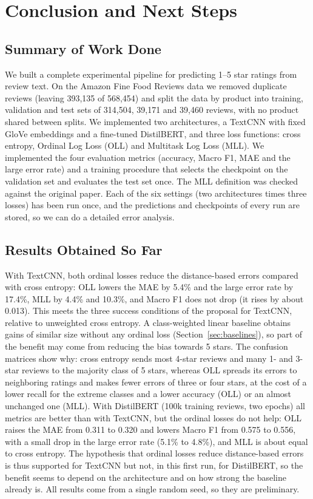 \section{Conclusion and Next Steps}
\label{sec:conclusion}

\subsection{Summary of Work Done}
We built a complete experimental pipeline for predicting 1--5 star ratings from review text. On the Amazon Fine Food Reviews data we removed duplicate reviews (leaving 393{,}135 of 568{,}454) and split the data by product into training, validation and test sets of 314{,}504, 39{,}171 and 39{,}460 reviews, with no product shared between splits. We implemented two architectures, a TextCNN with fixed GloVe embeddings and a fine-tuned DistilBERT, and three loss functions: cross entropy, Ordinal Log Loss (OLL) and Multitask Log Loss (MLL). We implemented the four evaluation metrics (accuracy, Macro F1, MAE and the large error rate) and a training procedure that selects the checkpoint on the validation set and evaluates the test set once. The MLL definition was checked against the original paper. Each of the six settings (two architectures times three losses) has been run once, and the predictions and checkpoints of every run are stored, so we can do a detailed error analysis.

\subsection{Results Obtained So Far}
With TextCNN, both ordinal losses reduce the distance-based errors compared with cross entropy: OLL lowers the MAE by 5.4\% and the large error rate by 17.4\%, MLL by 4.4\% and 10.3\%, and Macro F1 does not drop (it rises by about 0.013). This meets the three success conditions of the proposal for TextCNN, relative to unweighted cross entropy. A class-weighted linear baseline obtains gains of similar size without any ordinal loss (Section~\ref{sec:baselines}), so part of the benefit may come from reducing the bias towards 5 stars. The confusion matrices show why: cross entropy sends most 4-star reviews and many 1- and 3-star reviews to the majority class of 5 stars, whereas OLL spreads its errors to neighboring ratings and makes fewer errors of three or four stars, at the cost of a lower recall for the extreme classes and a lower accuracy (OLL) or an almost unchanged one (MLL).
With DistilBERT (100k training reviews, two epochs) all metrics are better than with TextCNN, but the ordinal losses do not help: OLL raises the MAE from 0.311 to 0.320 and lowers Macro F1 from 0.575 to 0.556, with a small drop in the large error rate (5.1\% to 4.8\%), and MLL is about equal to cross entropy. The hypothesis that ordinal losses reduce distance-based errors is thus supported for TextCNN but not, in this first run, for DistilBERT, so the benefit seems to depend on the architecture and on how strong the baseline already is.
All results come from a single random seed, so they are preliminary.

